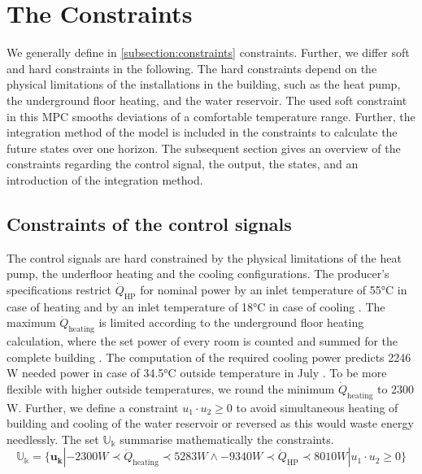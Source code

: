\section{The Constraints}
\label{section:theconstraints}
We generally define in \autoref{subsection:constraints} constraints. Further, we differ soft and hard constraints in the following. The hard constraints depend on the physical limitations of the installations in the building, such as the heat pump, the underground floor heating, and the water reservoir. The used soft constraint in this MPC smooths deviations of a comfortable temperature range. Further, the integration method of the model is included in the constraints to calculate the future states over one horizon. The subsequent section gives an overview of the constraints regarding the control signal, the output, the states, and an introduction of the integration method.

\subsection{Constraints of the control signals}
\label{subsec:COnstraintU}
The control signals are hard constrained by the physical limitations of the heat pump, the underfloor heating and the cooling configurations.\newline
The producer's specifications restrict $\dot{Q}_\text{HP}$ for nominal power by an inlet temperature of 55°C in case of heating and by an inlet temperature of 18°C in case of cooling \cite{TUM}. The maximum $\dot{Q}_\text{heating}$ is limited according to the underground floor heating calculation, where the set power of every room is counted and summed for the complete building \cite{Roth_Auslegung.2020}. The computation of the required cooling power predicts 2246 W needed power in case of 34.5°C outside temperature in July \cite{SEFIngenieurgesellschaftMBH.2019}. To be more flexible with higher outside temperatures, we round the minimum $\dot{Q}_\text{heating}$ to 2300 W.\newline
Further, we define a constraint $u_1 \cdot u_2 \geq 0$ to avoid simultaneous heating of building and cooling of the water reservoir or reversed as this would waste energy needlessly.
The set $\mathbb{U_k}$ summarise mathematically the constraints.
\begin{equation}
    \label{ConstraintU}
    \mathbb{U_k} = \{\mathbf{u_k}| -2300 W \prec \dot{Q}_\text{heating} \prec 5283 W \wedge -9340 W \prec \dot{Q}_\text{HP} \prec 8010 W | u_1 \cdot u_2 \geq 0\} 
\end{equation}

